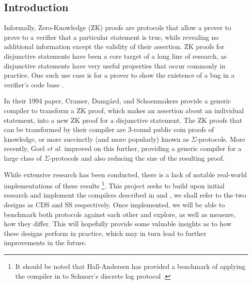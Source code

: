 \subsection{Introduction}
Informally, Zero-Knowledge (ZK) proofs are protocols that allow a prover to prove to a verifier that a particular statement is true, while revealing no additional information except the validity of their assertion. ZK proofs for disjunctive statements have been a core target of a long line of research, as disjunctive statements have very useful properties that occur commonly in practice. One such use case is for a prover to show the existence of a bug in a verifier's code base \cite{StackedGF}.

In their 1994 paper, Cramer, Damg{\aa}rd, and Schoenmakers \cite{CDS94} provide a generic compiler to transform a ZK proof, which makes an assertion about an individual statement, into a new ZK proof for a disjunctive statement. The ZK proofs that can be transformed by their compiler are 3-round public coin proofs of knowledge, or more succinctly (and more popularly) known as $\Sigma$-protocols. %
More recently, Goel {\em et al.} \cite{StackingSigmas} improved on this further, providing a generic compiler for a large class of $\Sigma$-protocols and also reducing the size of the resulting proof. 

While extensive research has been conducted, there is a lack of notable real-world implementations of these results
\footnote{It should be noted that Hall-Andersen \cite{MHAStackSig} has provided a benchmark of applying the compiler in \cite{StackingSigmas} to Schnorr's discrete log protocol \cite{Schnorr}.}. 
This project seeks to build upon initial research and implement the compilers described in \cite{CDS94} and \cite{StackingSigmas}, we shall refer to the two designs as CDS and SS respectively. Once implemented, we will be able to benchmark both protocols against each other and explore, as well as measure, how they differ. This will hopefully provide some valuable insights as to how these designs perform in practice, which may in turn lead to further improvements in the future. 



